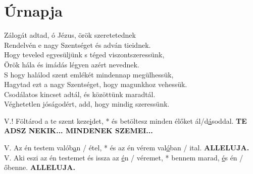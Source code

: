 \documentclass[twoside]{article}
\begin{document}
\section*{Úrnapja}

Zálogát adtad, ó Jézus, örök szeretetednek\\
Rendelvén e nagy Szentséget és adván tieidnek.\\
Hogy teveled egyesüljünk s téged viszontszeressünk,\\
Örök hála és imádás légyen azért nevednek.\\

S hogy halálod szent emlékét mindennap megülhessük,\\
Hagytad ezt a nagy Szentséget, hogy magunkhoz vehessük.\\
Csodálatos kincset adtál, és közöttünk maradtál.\\
Véghetetlen jóságodért, add, hogy mindig szeressünk.



\begin{psalmsheet}[tone=8, number={80. zsoltár}]
\end{psalmsheet}



V.! Föltárod a te szent keze\underline{i}det, * és betöltesz minden élőket ál/d\underline{á}soddal. \textbf{TE ADSZ NEKIK... MINDENEK SZEMEI...}


V. Az én testem valób\underline{a}n / étel, * és az én vérem val\underline{ó}ban / ital. \textbf{ALLELUJA.}\\
V. Aki eszi az én testemet és issza az \underline{é}n / véremet, * bennem marad, \underline{é}s én / őbenne. \textbf{ALLELUJA.}
\end{document}
